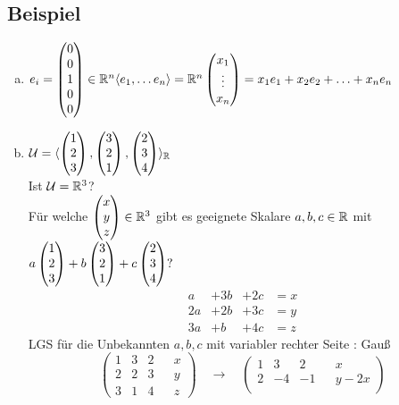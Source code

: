 \subsection{Beispiel}
\begin{enumerate}[a)]
\item $e_i = \begin{pmatrix}
0\\0\\1\\0\\0
\end{pmatrix}\in\mathbb{R}^n\\
\langle e_1,\ldots e_n\rangle = \mathbb{R}^n\\
\begin{pmatrix}
x_1\\\vdots\\x_n
\end{pmatrix} = x_1e_1+x_2e_2+\ldots+x_ne_n$
\item $\mathcal{U} = \langle \begin{pmatrix}
1\\2\\3
\end{pmatrix},\begin{pmatrix}
3\\2\\1
\end{pmatrix},\begin{pmatrix}
2\\3\\4
\end{pmatrix}\rangle_{\mathbb{R}}$\\
Ist $\mathcal{U} = \mathbb{R}^3$?\\
Für welche $\begin{pmatrix} x\\y\\z \end{pmatrix} \in \mathbb{R}^3$ gibt es geeignete Skalare $a,b,c\in\mathbb{R}$ mit $a\begin{pmatrix} 1\\2\\3 \end{pmatrix}+b\begin{pmatrix} 3\\2\\1 \end{pmatrix}+c\begin{pmatrix} 2\\3\\4 \end{pmatrix}?\\$
\[ \begin{matrix}
a &+3b&+2c&=x\\
2a&+2b&+3c&=y\\
3a&+b &+4c&=z
\end{matrix} \]
LGS für die Unbekannten $a,b,c$ mit variabler rechter Seite : Gau\ss\\
\[ \begin{pmatrix}
1&3&2&&x\\
2&2&3&&y\\
3&1&4&&z
\end{pmatrix}\quad\to\quad\begin{pmatrix}
1&3&2&&x\\
2&-4&-1&&y-2x\\

\end{pmatrix}\]
\end{enumerate}
